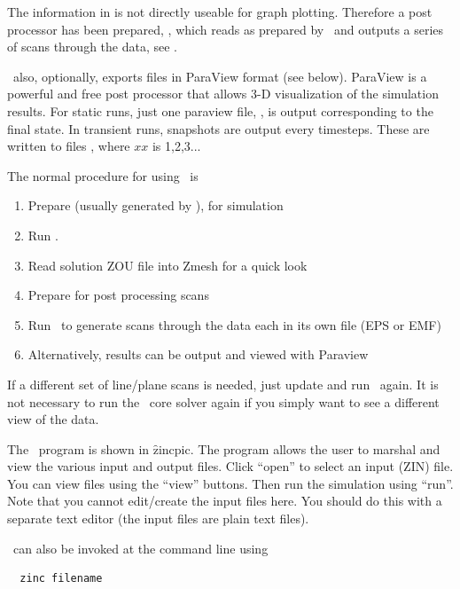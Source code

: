 \documentclass[a4paper,twoside,11pt]{book}
\begin{document}
The information in  is not directly useable for
graph plotting. Therefore a post processor has been prepared, \zpp,
which reads  as prepared by \zinc\ and outputs a
series of scans through the data, see .

\zinc\ also, optionally, exports files in ParaView format (see
 below). ParaView is a powerful and free post processor that
allows 3-D visualization of the simulation results. For static runs,
just one paraview file, , is output corresponding to
the final state. In transient runs, snapshots are output every
 timesteps. These are written to files
, where $xx$ is 1,2,3...

The normal procedure for using \zinc\ is
\begin{enumerate}
  \item Prepare  (usually generated by \zmesh),
   for simulation
  \item Run \zinc.
  \item Read solution ZOU file into Zmesh for a quick look
  \item Prepare  for post processing scans
  \item Run \zpp\ to generate scans through the data each in its own
    file (EPS or EMF)
  \item Alternatively, results can be output and viewed with Paraview
\end{enumerate}

If a different set of line/plane scans is needed, just update
 and run \zpp\ again. It is not necessary to run the
\zinc\ core solver again if you simply want to see a different view of
the data.

The \zinc\ program is shown in \f{zincpic}. The program allows the
user to marshal and view the various input and output files. Click
``open'' to select an input (ZIN) file. You can view files using the
``view'' buttons. Then run the simulation using ``run''. Note that you
cannot edit/create the input files here. You should do this with a
separate text editor (the input files are plain text files).

\zinc\ can also be invoked at the command line using
\begin{verbatim}
  zinc filename
\end{verbatim}
\end{document}
